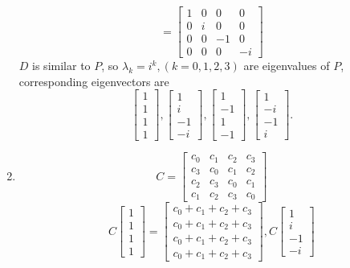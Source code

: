 \documentclass{article}
\begin{document}
\begin{enumerate}
\[=\left[\begin{array}{rrrr}
 1 & 0 & 0 & 0 \\
 0 & i & 0 & 0 \\
 0 & 0 &-1 & 0 \\
 0 & 0 & 0 &-i
\end{array}\right]\]
$D$ is similar to $P$, so $\lambda_k=i^k,(k=0,1,2,3)$ are eigenvalues of $P$, corresponding eigenvectors are 
\[ 
\left[\begin{array}{c}1\\1\\1\\1\end{array}\right],
\left[\begin{array}{c}1\\i\\-1\\-i\end{array}\right],
\left[\begin{array}{c}1\\-1\\1\\-1\end{array}\right],
\left[\begin{array}{c}1\\-i\\-1\\i\end{array}\right].
\]
    \item
    \[C=\left[\begin{array}{rrrr}
 c_0 & c_1 & c_2 & c_3 \\
 c_3 & c_0 & c_1 & c_2 \\
 c_2 & c_3 & c_0 & c_1 \\
 c_1 & c_2 & c_3 & c_0
\end{array}\right]\]
\[C \left[\begin{array}{c}1\\1\\1\\1\end{array}\right]
=\left[\begin{array}{c}c_0+c_1+c_2+c_3\\c_0+c_1+c_2+c_3\\c_0+c_1+c_2+c_3\\c_0+c_1+c_2+c_3\end{array}\right],
C \left[\begin{array}{c}1\\i\\-1\\-i\end{array}\right]
\]
\end{enumerate}
\end{document}
